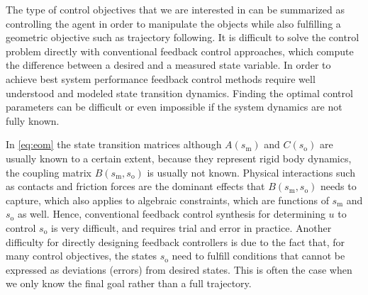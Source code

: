 The type of control objectives that we are interested in can be summarized as controlling the agent in order to manipulate the objects while also fulfilling a geometric objective such as trajectory following.
It is difficult to solve the control problem directly with conventional feedback control approaches, which compute the difference between a desired and a measured state variable.
In order to achieve best system performance feedback control methods require well understood and modeled state transition dynamics. 
Finding the optimal control parameters can be difficult or even impossible if the system dynamics are not fully known.

In \eqref{eq:eom} the state transition matrices although $A(s_\text{m})$ and $C(s_\text{o})$ are usually known to a certain extent, because they represent rigid body dynamics, the coupling matrix $B(s_\text{m}, s_\text{o})$ is usually not known. 
Physical interactions such as contacts and friction forces are the dominant effects that $B(s_\text{m}, s_\text{o})$  needs to capture, which also applies to algebraic constraints, which are functions of $s_\text{m}$ and $s_\text{o}$ as well. 
Hence, conventional feedback control synthesis for determining $u$ to control $s_\text{o}$ is very difficult, and requires trial and error in practice.
Another difficulty for directly designing feedback controllers is due to the fact that, for many control objectives, the states $s_\text{o}$ need to fulfill conditions that cannot be expressed as deviations (errors) from desired states. 
This is often the case when we only know the final goal rather than a full trajectory.

